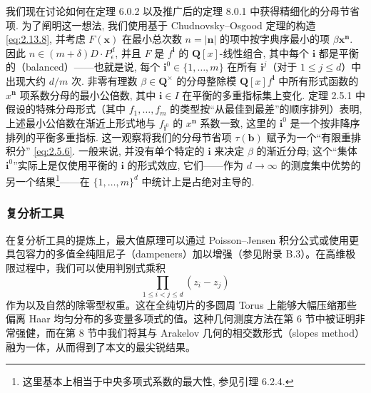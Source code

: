 我们现在讨论如何在定理 6.0.2 以及推广后的定理 8.0.1 中获得精细化的分母节省项. 为了阐明这一想法, 我们使用基于 Chudnovsky--Osgood 定理的构造 \eqref{eq:2.13.8}, 并考虑 \(F(\mathbf{x})\) 在最小总次数 \(n = \lvert\mathbf{n}\rvert\) 的项中按字典序最小的项 \(\beta \mathbf{x}^{\mathbf{n}}\). 因此 \(n \in (m + \delta)D \cdot P^d_\epsilon\), 并且 \(F\) 是 \(f^{\mathbf{i}}\) 的 \(\mathbf{Q}[x]\)-线性组合, 其中每个 \(\mathbf{i}\) 都是平衡的（balanced）——也就是说, 每个 \(\mathbf{i}^0 \in \{1, \dots, m\}\) 在所有 \(\mathbf{i}^j\)（对于 \(1 \le j \le d\)）中出现大约 \(d/m\) 次. 非零有理数 \(\beta \in \mathbf{Q}^{\times}\) 的分母整除模 \(\mathbf{Q}[x]f^{\mathbf{i}}\) 中所有形式函数的 \(x^{\mathbf{n}}\) 项系数分母的最小公倍数, 其中 \(\mathbf{i} \in I\) 在平衡的多重指标集上变化. 定理 2.5.1 中假设的特殊分母形式（其中 \(f_1, \dots, f_m\) 的类型按“从最佳到最差”的顺序排列）表明, 上述最小公倍数在渐近上形式地与 \(f_{\mathbf{i}^0}\) 的 \(x^{\mathbf{n}}\) 系数一致, 这里的 \(\mathbf{i}^0\) 是一个按非降序排列的平衡多重指标. 这一观察将我们的分母节省项 \(\tau(\mathbf{b})\) 赋予为一个“有限重排积分” \eqref{eq:2.5.6}. 一般来说, 并没有单个特定的 \(\mathbf{i}\) 来决定 \(\beta\) 的渐近分母; 这个“集体 \(\mathbf{i}^0\)”实际上是仅使用平衡的 \(\mathbf{i}\) 的形式效应, 它们——作为 \(d \to \infty\) 的测度集中优势的另一个结果\setcounter{footnote}{12}\footnote{这里基本上相当于中央多项式系数的最大性, 参见引理 6.2.4.}——在 \(\{1, \dots, m\}^d\) 中统计上是占绝对主导的.

\subsubsection{复分析工具}\label{sec:2.13.10}

在复分析工具的提炼上，最大值原理可以通过 Poisson--Jensen 积分公式或使用更具包容力的多值全纯阻尼子（dampeners）加以增强（参见附录 B.3）。在高维极限过程中，我们可以使用判别式乘积
\[ \prod_{1 \le i < j \le d} (z_i - z_j) \]
作为以及自然的除零型权重。这在全纯切片的多圆周 Torus 上能够大幅压缩那些偏离 Haar 均匀分布的多变量多项式的值。这种几何测度方法在第 6 节中被证明非常强健，而在第 8 节中我们将其与 Arakelov 几何的相交数形式（slopes method）融为一体，从而得到了本文的最尖锐结果。

